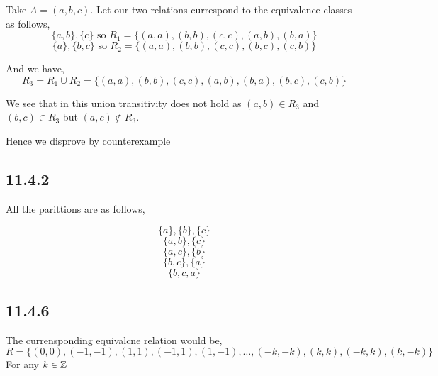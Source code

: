 \documentclass[a4paper]{report}
\begin{document}
Take $A = (a,b,c)$. Let our two relations currespond to the equivalence classes as follows,  
$$ \{a,b\},\{c\} \text{ so } R_1= \{(a,a),(b,b),(c,c),(a,b),(b,a)\}$$ 
$$ \{a\},\{b,c\} \text{ so } R_2=  \{(a,a),(b,b),(c,c),(b,c),(c,b)\}$$ 


And we have, 
$$ R_3 = R_1\cup R_2 = \{(a,a),(b,b),(c,c),(a,b),(b,a), (b,c), (c,b)\} $$ 

We see that in this union transitivity does not hold as  $(a,b) \in R_3$ and $(b,c) \in R_3$ but $(a,c) \not \in R_3$. 

Hence we disprove by counterexample


\subsection*{11.4.2}
All the parittions are as follows, 

$$ \{a\}, \{b\},\{c\} $$ 
$$ \{a,b\},\{c\} $$ 
$$ \{a,c\},\{b\} $$ 
$$ \{b,c\},\{a\} $$ 
$$ \{b,c,a\} $$ 






\subsection*{11.4.6}
The currensponding equivalcne relation would be, 
$$R =  \{(0,0), (-1,-1), (1,1), (-1,1), (1,-1), \dots, (-k,-k), (k,k), (-k, k), (k, -k)\} $$
For any $k \in \mathbb{Z}$




 
\end{document}
